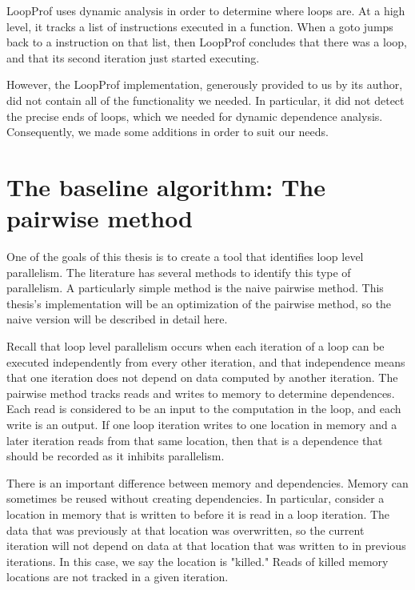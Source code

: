 \documentclass[12pt,twoside]{reedthesis}
\begin{document}
		LoopProf uses dynamic analysis in order to determine where loops are. At a high level, it tracks a list of instructions executed in a function. When a goto jumps back to a instruction on that list, then LoopProf concludes that there was a loop, and that its second iteration just started executing. 
		
		However, the LoopProf implementation, generously provided to us by its author, did not contain all of the functionality we needed. In particular, it did not detect the precise ends of loops, which we needed for dynamic dependence analysis. Consequently, we made some additions in order to suit our needs. 
		
	\section{The baseline algorithm: The pairwise method}
	
		One of the goals of this thesis is to create a tool that identifies loop level parallelism. The literature has several methods to identify this type of parallelism. A particularly simple method is the naive pairwise method. This thesis's implementation will be an optimization of the pairwise method, so the naive version will be described in detail here. 
		
		Recall that loop level parallelism occurs when each iteration of a loop can be executed independently from every other iteration, and that independence means that one iteration does not depend on data computed by another iteration. 
		The pairwise method tracks reads and writes to memory to determine dependences. Each read is considered to be an input to the computation in the loop, and each write is an output. If one loop iteration writes to one location in memory and a later iteration reads from that same location, then that is a dependence that should be recorded as it inhibits parallelism. 
		
		There is an important difference between memory and dependencies. Memory can sometimes be reused without creating dependencies. In particular, consider a location in memory that is written to before it is read in a loop iteration. The data that was previously at that location was overwritten, so the current iteration will not depend on data at that location that was written to in previous iterations. In this case, we say the location is "killed." Reads of killed memory locations are not tracked in a given iteration.
		
\end{document}

